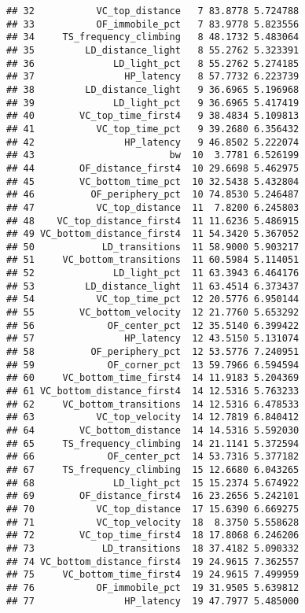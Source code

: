 \documentclass[oneside]{book}
\begin{document}
\begin{verbatim}
## 32           VC_top_distance   7 83.8778 5.724788
## 33           OF_immobile_pct   7 83.9778 5.823556
## 34     TS_frequency_climbing   8 48.1732 5.483064
## 35         LD_distance_light   8 55.2762 5.323391
## 36              LD_light_pct   8 55.2762 5.274185
## 37                HP_latency   8 57.7732 6.223739
## 38         LD_distance_light   9 36.6965 5.196968
## 39              LD_light_pct   9 36.6965 5.417419
## 40        VC_top_time_first4   9 38.4834 5.109813
## 41           VC_top_time_pct   9 39.2680 6.356432
## 42                HP_latency   9 46.8502 5.222074
## 43                        bw  10  3.7781 6.526199
## 44        OF_distance_first4  10 29.6698 5.462975
## 45        VC_bottom_time_pct  10 32.5438 5.432804
## 46          OF_periphery_pct  10 74.8530 5.246487
## 47           VC_top_distance  11  7.8200 6.245803
## 48    VC_top_distance_first4  11 11.6236 5.486915
## 49 VC_bottom_distance_first4  11 54.3420 5.367052
## 50            LD_transitions  11 58.9000 5.903217
## 51     VC_bottom_transitions  11 60.5984 5.114051
## 52              LD_light_pct  11 63.3943 6.464176
## 53         LD_distance_light  11 63.4514 6.373437
## 54           VC_top_time_pct  12 20.5776 6.950144
## 55        VC_bottom_velocity  12 21.7760 5.653292
## 56             OF_center_pct  12 35.5140 6.399422
## 57                HP_latency  12 43.5150 5.131074
## 58          OF_periphery_pct  12 53.5776 7.240951
## 59             OF_corner_pct  13 59.7966 6.594594
## 60     VC_bottom_time_first4  14 11.9183 5.204369
## 61 VC_bottom_distance_first4  14 12.5316 5.763233
## 62     VC_bottom_transitions  14 12.5316 6.478533
## 63           VC_top_velocity  14 12.7819 6.840412
## 64        VC_bottom_distance  14 14.5316 5.592030
## 65     TS_frequency_climbing  14 21.1141 5.372594
## 66             OF_center_pct  14 53.7316 5.377182
## 67     TS_frequency_climbing  15 12.6680 6.043265
## 68              LD_light_pct  15 15.2374 5.674922
## 69        OF_distance_first4  16 23.2656 5.242101
## 70           VC_top_distance  17 15.6390 6.669275
## 71           VC_top_velocity  18  8.3750 5.558628
## 72        VC_top_time_first4  18 17.8068 6.246206
## 73            LD_transitions  18 37.4182 5.090332
## 74 VC_bottom_distance_first4  19 24.9615 7.362557
## 75     VC_bottom_time_first4  19 24.9615 7.499959
## 76           OF_immobile_pct  19 31.9505 5.639812
## 77                HP_latency  19 47.7977 5.485000
\end{verbatim}
\end{document}
